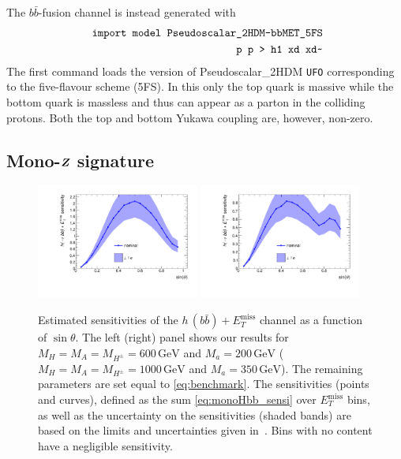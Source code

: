 \documentclass[review]{elsarticle}
\newcommand{\MET}{\ensuremath{E_T^\mathrm{miss}}\xspace}
\newcommand{\met}{\MET}
\newcommand{\mA}{\ensuremath{M_{A}}\xspace}
\newcommand{\ma}{\ensuremath{M_{a}}\xspace}
\newcommand{\mH}{\ensuremath{M_{H}}\xspace}
\newcommand{\mHc}{\ensuremath{M_{H^{\pm}}}\xspace}
\def\bm#1{\mbox{\boldmath$#1$\unboldmath}}
\begin{document}
The $b \bar b$-fusion channel is instead generated with 
\begin{eqnarray}
&& \verb| import model Pseudoscalar_2HDM-bbMET_5FS  | \nonumber \\
&& \verb| p p > h1 xd xd~  | \nonumber 
\end{eqnarray}
The first command loads the version of Pseudoscalar\_2HDM {\tt UFO}  corresponding to the five-flavour scheme (5FS). In this only the top quark is massive while the bottom quark is massless and thus 
can appear as a parton in the colliding protons. Both the top and bottom Yukawa coupling  are, however, non-zero.

\subsection[Mono-$Z$ signature]{Mono-$\bm{Z}$ signature}

\begin{figure}[t!]
\centering
\includegraphics[width=0.475\textwidth]{monoHbb_sinp_scan_1_sensi_1D.pdf} \quad 
\includegraphics[width=0.475\textwidth]{monoHbb_sinp_scan_2_sensi_1D.pdf}
\vspace{4mm}
\caption{Estimated sensitivities of  the $h \, (b \bar b)+\MET$ channel as a function of $\sin \theta$. The left (right) panel shows our results for $\mH = \mA = \mHc = 600 \, {\mathrm{GeV}}$ and $\ma = 200 \, {\mathrm{GeV}}$ ($\mH = \mA = \mHc = 1000 \, {\mathrm{GeV}}$ and $\ma = 350 \, {\mathrm{GeV}}$).  The remaining parameters are set equal to \eqref{eq:benchmark}. The sensitivities (points and curves), defined as the sum \eqref{eq:monoHbb_sensi} over \met bins, as well as the uncertainty on the sensitivities (shaded bands)  are based on the limits and uncertainties given in~\cite{Aaboud:2017yqz}. Bins with no content have a negligible sensitivity. }
\label{fig:monoHbb_appendix1}
\end{figure}
\end{document}
